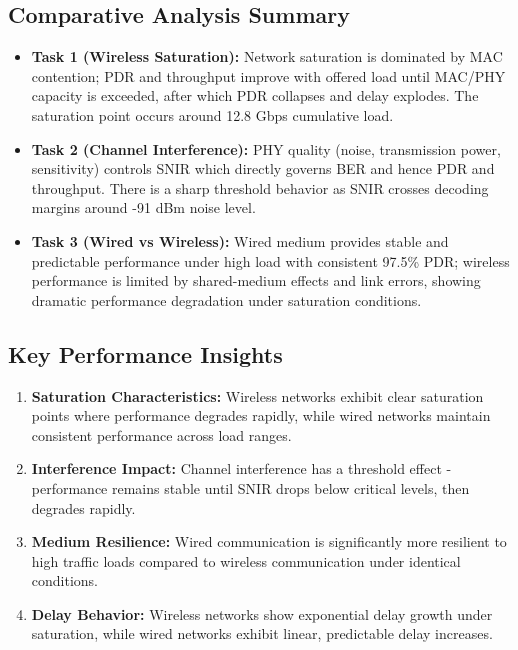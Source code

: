 \documentclass{article}
\begin{document}
\subsection{Comparative Analysis Summary}

\begin{itemize}

  \item \textbf{Task 1 (Wireless Saturation):} Network saturation is dominated by MAC contention; PDR and throughput improve with offered load until MAC/PHY capacity is exceeded, after which PDR collapses and delay explodes. The saturation point occurs around 12.8 Gbps cumulative load.

  

  \item \textbf{Task 2 (Channel Interference):} PHY quality (noise, transmission power, sensitivity) controls SNIR which directly governs BER and hence PDR and throughput. There is a sharp threshold behavior as SNIR crosses decoding margins around -91 dBm noise level.

  

  \item \textbf{Task 3 (Wired vs Wireless):} Wired medium provides stable and predictable performance under high load with consistent 97.5\% PDR; wireless performance is limited by shared-medium effects and link errors, showing dramatic performance degradation under saturation conditions.

\end{itemize}

\subsection{Key Performance Insights}

\begin{enumerate}

  \item \textbf{Saturation Characteristics:} Wireless networks exhibit clear saturation points where performance degrades rapidly, while wired networks maintain consistent performance across load ranges.

  

  \item \textbf{Interference Impact:} Channel interference has a threshold effect - performance remains stable until SNIR drops below critical levels, then degrades rapidly.

  

  \item \textbf{Medium Resilience:} Wired communication is significantly more resilient to high traffic loads compared to wireless communication under identical conditions.

  

  \item \textbf{Delay Behavior:} Wireless networks show exponential delay growth under saturation, while wired networks exhibit linear, predictable delay increases.

\end{enumerate}
\end{document}
